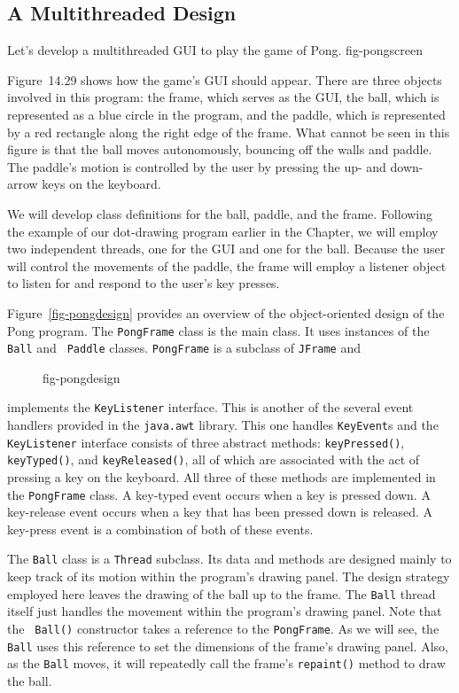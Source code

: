 \subsection{A Multithreaded Design}

Let's develop a multithreaded GUI to play the game of Pong.
{fig-pongscreen}

Figure~14.29 shows how the game's GUI should appear.  There
are three objects involved in this program: the frame, which serves
as the GUI, the ball, which is represented as a blue circle in the
program, and the paddle, which is represented by a red rectangle along
the right edge of the frame. What cannot be seen in this figure is 
that the ball moves autonomously, bouncing off the walls and paddle.
The paddle's motion is controlled by the user by pressing the up- and
down-arrow keys on the keyboard. 

We will develop class definitions for the ball, paddle, and the
frame. Following the example of our dot-drawing program earlier in
the Chapter, we will employ two independent threads, one for the GUI
and one for the ball.  Because the user will control the movements of
the paddle, the frame will employ a listener object to listen for and
respond to the user's key presses. 

Figure~\ref{fig-pongdesign} provides an overview of the
object-oriented design of the Pong program. The {\tt PongFrame} class
is the main class. It uses instances of the {\tt Ball} and {\tt
Paddle} classes.  {\tt PongFrame} is a subclass of {\tt JFrame} and
\begin{figure}[h!]
 {fig-pongdesign}

\end{figure}
implements the {\tt KeyListener} interface. This is another of the
several event handlers provided in the {\tt java.awt} library. This
one handles {\tt KeyEvent}s and the {\tt KeyListener} interface
consists of three abstract methods: {\tt keyPressed()}, {\tt
keyTyped()}, and {\tt keyReleased()}, all of which are associated with
the act of pressing a key on the keyboard. All three of these
methods are implemented in the {\tt PongFrame} class.  A key-typed
event occurs when a key is pressed down. A key-release event occurs
when a key that has been pressed down is released.  A key-press event
is a combination of both of these events.

The {\tt Ball} class is a {\tt Thread} subclass. Its data and methods
are designed mainly to keep track of its motion within the program's
drawing panel. The design strategy employed here leaves the drawing of
the ball up to the frame. The {\tt Ball} thread itself just 
handles the movement within the program's drawing panel.  Note that the {\tt
Ball()} constructor takes a reference to the {\tt PongFrame}. As we
will see, the {\tt Ball} uses this reference to set the dimensions of
the frame's drawing panel. Also, as the {\tt Ball} moves, it will
repeatedly call the frame's {\tt repaint()} method to draw the ball.

